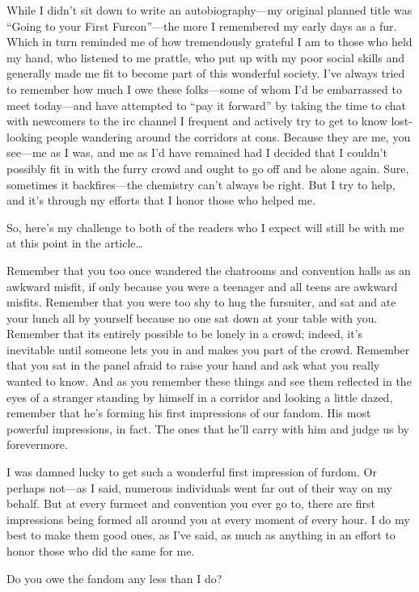 While I didn't sit down to write an autobiography—my original planned title was ``Going to your First Furcon''—the more I remembered my early days as a fur. Which in turn reminded me of how tremendously grateful I am to those who held my hand, who listened to me prattle, who put up with my poor social skills and generally made me fit to become part of this wonderful society. I've always tried to remember how much I owe these folks—some of whom I'd be embarrassed to meet today—and have attempted to ``pay it forward'' by taking the time to chat with newcomers to the irc channel I frequent and actively try to get to know lost-looking people wandering around the corridors at cons. Because they are me, you see—me as I was, and me as I'd have remained had I decided that I couldn't possibly fit in with the furry crowd and ought to go off and be alone again. Sure, sometimes it backfires—the chemistry can't always be right. But I try to help, and it's through my efforts that I honor those who helped me.

So, here's my challenge to both of the readers who I expect will still be with me at this point in the article\ldots

Remember that you too once wandered the chatrooms and convention halls as an awkward misfit, if only because you were a teenager and all teens are awkward misfits. Remember that you were too shy to hug the fursuiter, and sat and ate your lunch all by yourself because no one sat down at your table with you. Remember that its entirely possible to be lonely in a crowd; indeed, it's inevitable until someone lets you in and makes you part of the crowd. Remember that you sat in the panel afraid to raise your hand and ask what you really wanted to know. And as you remember these things and see them reflected in the eyes of a stranger standing by himself in a corridor and looking a little dazed, remember that he's forming his first impressions of our fandom. His most powerful impressions, in fact. The ones that he'll carry with him and judge us by forevermore.

I was damned lucky to get such a wonderful first impression of furdom. Or perhaps not—as I said, numerous individuals went far out of their way on my behalf. But at every furmeet and convention you ever go to, there are first impressions being formed all around you at every moment of every hour. I do my best to make them good ones, as I've said, as much as anything in an effort to honor those who did the same for me.

Do you owe the fandom any less than I do?
